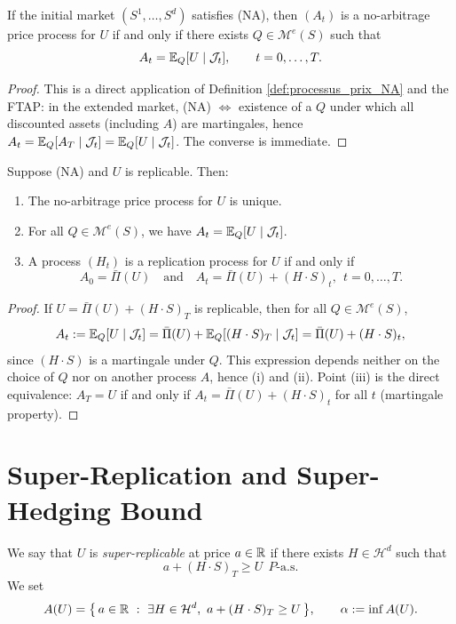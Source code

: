 \begin{lemma}\label{lem:prix_dynamique_EQ}
If the initial market $(S^1,\dots,S^d)$ satisfies (NA), then $(A_t)$ is a no-arbitrage price process
for $U$ if and only if there exists $Q\in\mathcal{M}^e(S)$ such that
\[
A_t=\mathbb{E}_Q[U\mid \mathcal{J}_t],\qquad t=0,\dots,T.
\]
\end{lemma}

\begin{proof}
This is a direct application of Definition \ref{def:processus_prix_NA} and the FTAP:
in the extended market, (NA) $\Leftrightarrow$ existence of a $Q$ under which all discounted assets
(including $A$) are martingales, hence $A_t=\mathbb{E}_Q[A_T\mid\mathcal{J}_t]=\mathbb{E}_Q[U\mid\mathcal{J}_t]$.
The converse is immediate.
\end{proof}

\begin{lemma}\label{lem:unicite_processus_si_replicable}
Suppose (NA) and $U$ is replicable. Then:
\begin{enumerate}
\item[(i)] The no-arbitrage price process for $U$ is unique.
\item[(ii)] For all $Q\in\mathcal{M}^e(S)$, we have $A_t=\mathbb{E}_Q[U\mid\mathcal{J}_t]$.
\item[(iii)] A process $(H_t)$ is a replication process for $U$ if and only if
\[
A_0=\bar\Pi(U)\quad\text{and}\quad A_t=\bar\Pi(U)+(H\cdot S)_t,\ \ t=0,\dots,T.
\]
\end{enumerate}
\end{lemma}

\begin{proof}
If $U=\bar\Pi(U)+(H\cdot S)_T$ is replicable, then for all $Q\in\mathcal{M}^e(S)$,
\[
A_t:=\mathbb{E}_Q[U\mid\mathcal{J}_t]=\bar\Pi(U)+\mathbb{E}_Q[(H\cdot S)_T\mid\mathcal{J}_t]
=\bar\Pi(U)+(H\cdot S)_t,
\]
since $(H\cdot S)$ is a martingale under $Q$. This expression depends neither on the choice
of $Q$ nor on another process $A$, hence (i) and (ii). Point (iii) is the direct equivalence:
$A_T=U$ if and only if $A_t=\bar\Pi(U)+(H\cdot S)_t$ for all $t$ (martingale property).
\end{proof}

\section{Super-Replication and Super-Hedging Bound}

\begin{definition}
We say that $U$ is \emph{super-replicable} at price $a\in\mathbb{R}$ if there exists $H\in\mathcal{H}^d$ such that
\[
a + (H\cdot S)_T \ge U\ \ \text{$P$-a.s.}
\]
We set
\begin{equation}
A(U)=\big\{\, a\in\mathbb{R}\ :\ \exists H\in\mathcal{H}^d,\ a+(H\cdot S)_T\ge U \,\big\},
\qquad
\alpha := \inf A(U).
\end{equation}
\end{definition}

